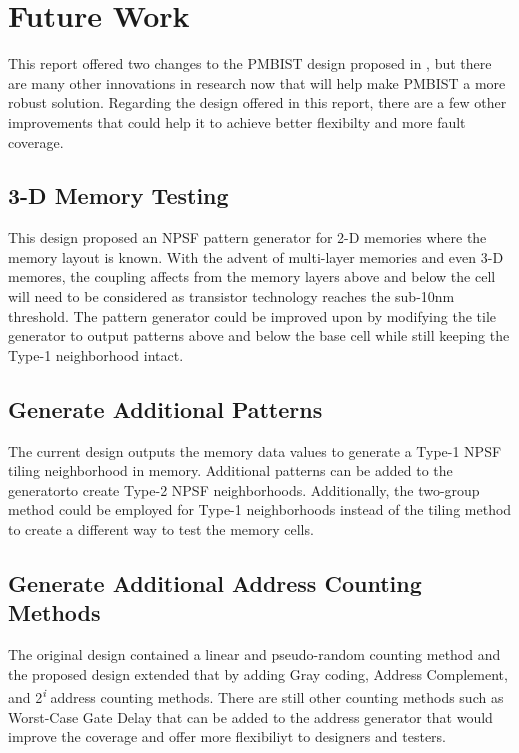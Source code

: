 \section{Future Work}
\label{sect:bg-future}
This report offered two changes to the PMBIST design proposed in \cite{3}, but there are many other innovations in research now that will help make PMBIST a more robust solution.  Regarding the design offered in this report, there are a few other improvements that could help it to achieve better flexibilty and more fault coverage.

\subsection{3-D Memory Testing}
This design proposed an NPSF pattern generator for 2-D memories where the memory layout is known.  With the advent of multi-layer memories and even 3-D memores, the coupling affects from the memory layers above and below the cell will need to be considered as transistor technology reaches the sub-10nm threshold.  The pattern generator could be improved upon by modifying the tile generator to output patterns above and below the base cell while still keeping the Type-1 neighborhood intact.

\subsection{Generate Additional Patterns}
The current design outputs the memory data values to generate a Type-1 NPSF tiling neighborhood in memory.  Additional patterns can be added to the generatorto create Type-2 NPSF neighborhoods.  Additionally, the two-group method could be employed for Type-1 neighborhoods instead of the tiling method to create a different way to test the memory cells.

\subsection{Generate Additional Address Counting Methods}
The original design contained a linear and pseudo-random counting method and the proposed design extended that by adding Gray coding, Address Complement, and 2\textsuperscript{\textit{i}} address counting methods.  There are still other counting methods such as Worst-Case Gate Delay that can be added to the address generator that would improve the coverage and offer more flexibiliyt to designers and testers.  
